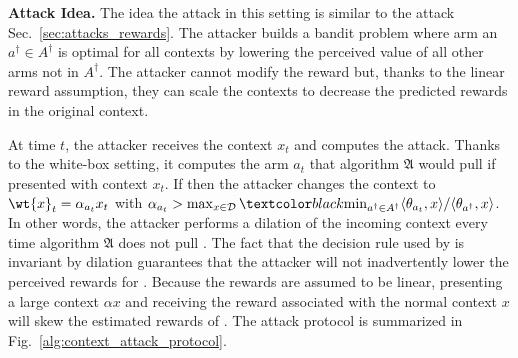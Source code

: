 \textbf{Attack Idea.} The idea  the attack in this setting is similar to the attack  Sec.~\ref{sec:attacks_rewards}. The attacker builds a bandit problem where arm an $a^{\dagger}\in A^{\dagger}$ is optimal for all contexts by lowering the perceived value of all other arms not in $A^{\dagger}$. 
The attacker cannot modify the reward but, thanks to the linear reward assumption, they can scale the contexts to decrease the predicted rewards in the original context. 

At time $t$, the attacker receives the context $x_t$ and computes the attack. 
Thanks to the white-box setting, it computes the arm $a_{t}$ that algorithm $\mathfrak{A}$ would pull if presented with context $x_{t}$. If  then the attacker changes the context to $\wt{x}_{t} =  \alpha_{a_t} x_{t}$ with $\alpha_{a_t} > \max_{x \in \mathcal{D}}\changelm{\min_{a^\dagger\in A^\dagger}} \langle \theta_{a_t}, x \rangle/\langle \theta_{a^{\dagger}}, x \rangle$.
%
In other words, the attacker performs a dilation of the incoming context every time algorithm $\mathfrak{A}$ does not pull . The fact that the decision rule used by \linucb is invariant by dilation guarantees that the attacker will not inadvertently lower the perceived rewards for .
Because the rewards are assumed to be linear, presenting a large context $\alpha x$ and receiving the reward associated with the normal context $x$ will skew the estimated rewards of \linucb. The attack protocol is summarized in Fig.~\ref{alg:context_attack_protocol}. 


